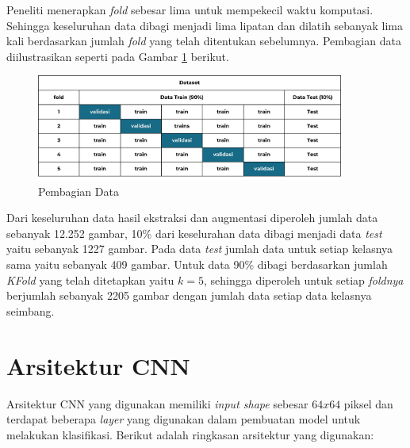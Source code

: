     Peneliti menerapkan \textit{fold} sebesar lima untuk mempekecil waktu komputasi. Sehingga keseluruhan data dibagi menjadi lima lipatan dan dilatih sebanyak lima kali berdasarkan jumlah \textit{fold }yang telah ditentukan sebelumnya. Pembagian data diilustrasikan seperti pada Gambar \ref{Pembagian Data} berikut.

         \begin{figure}[H]
               \centering
               \includegraphics[width=0.90\textwidth]{figures/bab4/kfold.png}
               \caption{Pembagian Data}
               \label{Pembagian Data}

         \end{figure}



    Dari keseluruhan data hasil ekstraksi dan augmentasi diperoleh jumlah data sebanyak 12.252 gambar, 10\% dari keselurahan data dibagi menjadi data \textit{test} yaitu sebanyak 1227 gambar. Pada data \textit{test} jumlah data untuk setiap kelasnya sama yaitu sebanyak 409 gambar. Untuk data 90\% dibagi berdasarkan jumlah \textit{KFold} yang telah ditetapkan yaitu $k = 5$, sehingga diperoleh untuk setiap \textit{foldnya} berjumlah sebanyak 2205 gambar dengan jumlah data setiap data kelasnya seimbang.
    



\section{Arsitektur CNN}

    Arsitektur CNN yang digunakan memiliki \textit{input shape} sebesar $ 64 x 64 $ piksel dan terdapat beberapa \textit{layer} yang digunakan dalam pembuatan model untuk melakukan klasifikasi. Berikut adalah ringkasan arsitektur yang digunakan:


